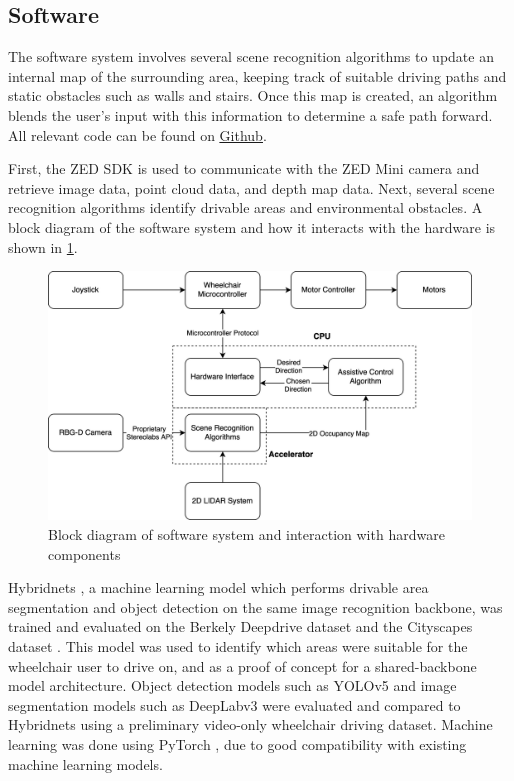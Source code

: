\subsection{Software}
The software system involves several scene recognition algorithms to update an internal
map of the surrounding area, keeping track of suitable driving paths and static obstacles
such as walls and stairs. Once this map is created, an algorithm blends the
user's input with this information to determine a safe path forward.
All relevant code can be found on \href{https://github.com/JakobWyatt/smart-wheelchair}{\underline{Github}}.

First, the ZED SDK is used to communicate with the ZED Mini camera and retrieve image data,
point cloud data, and depth map data. Next, several scene recognition algorithms
identify drivable areas and environmental obstacles. A block diagram of the software system
and how it interacts with the hardware is shown in \cref{fig:block_diagram}.

\begin{figure}[b]
    \centering
    \includegraphics[width=0.9\linewidth]{images/block_diagram.png}
    \caption{Block diagram of software system and interaction with hardware components}
    \label{fig:block_diagram}
\end{figure}

Hybridnets \cite{vuHybridNetsEndtoEndPerception2022},
a machine learning model which performs drivable area segmentation and object detection on the same
image recognition backbone, was trained and evaluated on the Berkely Deepdrive dataset \cite{yuBDD100KDiverseDriving2018}
and the Cityscapes dataset \cite{cordtsCityscapesDatasetSemantic2016}. This model was used to identify
which areas were suitable for the wheelchair user to drive on,
and as a proof of concept for a shared-backbone model architecture.
Object detection models such as YOLOv5 \cite{ultralyticsYOLOv5} and image segmentation models such as
DeepLabv3 \cite{chenRethinkingAtrousConvolution2017} were evaluated and compared to Hybridnets using a preliminary
video-only wheelchair driving dataset.
Machine learning was done using PyTorch \cite{paszkePyTorchImperativeStyle2019}, due to good compatibility
with existing machine learning models.

